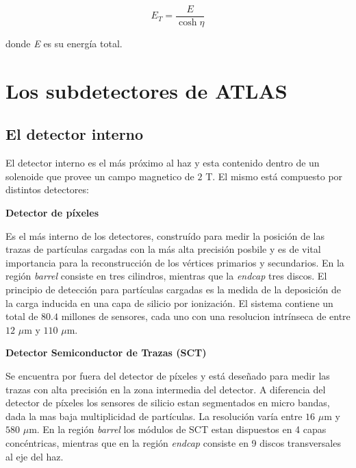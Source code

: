 \begin{equation}
E_{T}=\frac{E}{\cosh \eta}
\end{equation}

donde \textit{E} es su energía total.

\section{Los subdetectores de ATLAS}

\subsection{El detector interno}

El detector interno es el más próximo al haz y esta contenido dentro de un solenoide que provee un campo magnetico de $2$ T. El mismo está compuesto por distintos detectores:

\vspace{0.5cm}

{\bf Detector de píxeles }

Es el más interno de los detectores, construído para medir la posición de las trazas de partículas cargadas con la más alta precisión posbile y es de vital importancia para la reconstrucción de los vértices primarios y secundarios. En la región \textit{barrel} consiste en tres cilindros, mientras que la \textit{endcap} tres discos. El principio de detección para partículas cargadas es la medida de la deposición de la carga inducida en una capa de silicio por ionización. El sistema contiene un total de $80.4$ millones de sensores, cada uno con una resolucion intrínseca de entre $12$ $\mu$m y $110$ $\mu$m.

\vspace{0.5cm}

{\bf Detector Semiconductor de Trazas (SCT) }

Se encuentra por fuera del detector de píxeles y está deseñado para medir las trazas con alta precisión en la zona intermedia del detector. A diferencia del detector de píxeles los sensores de silicio estan segmentados en micro bandas, dada la mas baja multiplicidad de partículas. La resolución varía entre $16$ $\mu$m y $580$ $\mu$m. En la región \textit{barrel} los módulos de SCT estan dispuestos en 4 capas concéntricas, mientras que en la región \textit{endcap} consiste en 9 discos transversales al eje del haz.

\vspace{0.5cm}

